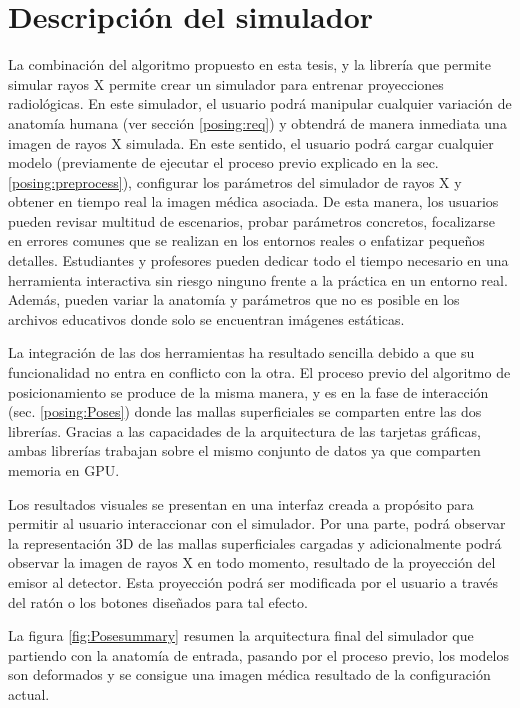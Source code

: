 \section{Descripción del simulador} 
\label{xray:method}

La combinación del algoritmo propuesto en esta tesis, y la librería que permite simular rayos X permite crear un simulador para entrenar proyecciones radiológicas. En este simulador, el usuario podrá manipular cualquier variación de anatomía humana (ver sección \ref{posing:req}) y obtendrá de manera inmediata una imagen de rayos X simulada. En este sentido, el usuario podrá cargar cualquier modelo (previamente de ejecutar el proceso previo explicado en la sec. \ref{posing:preprocess}), configurar los parámetros del simulador de rayos X y obtener en tiempo real la imagen médica asociada. De esta manera, los usuarios pueden revisar multitud de escenarios, probar parámetros concretos, focalizarse en errores comunes que se realizan en los entornos reales o enfatizar pequeños detalles. Estudiantes y profesores pueden dedicar todo el tiempo necesario en una herramienta interactiva sin riesgo ninguno frente a la práctica en un entorno real. Además, pueden variar la anatomía  y parámetros que no es posible en los archivos educativos donde solo se encuentran imágenes estáticas. 

La integración de las dos herramientas ha resultado sencilla debido a que su funcionalidad no entra en conflicto con la otra. El proceso previo del algoritmo de posicionamiento se produce de la misma manera, y es en la fase de interacción (sec. \ref{posing:Poses}) donde las mallas superficiales se comparten entre las dos librerías. Gracias a las capacidades de  la arquitectura de las tarjetas gráficas, ambas librerías trabajan sobre el mismo conjunto de datos ya que comparten memoria en \ac{GPU}.

Los resultados visuales se presentan en una interfaz creada a propósito para permitir al usuario interaccionar con el simulador. Por una parte, podrá observar la representación 3D de las mallas superficiales cargadas y adicionalmente podrá observar la imagen de rayos X en todo momento, resultado de la proyección del emisor al detector. Esta proyección podrá ser modificada por el usuario a través del ratón o los botones diseñados para tal efecto. 

La figura \ref{fig:Posesummary} resumen la arquitectura final del simulador que partiendo con la anatomía de entrada, pasando por el proceso previo, los modelos son deformados y se consigue una imagen médica resultado de la configuración actual.

